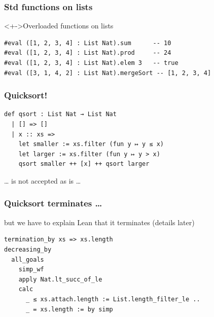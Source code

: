 \documentclass{beamer}
\begin{document}
\begin{frame}[fragile]
  \frametitle{Std functions on lists}
  \begin{block}<+->{Overloaded functions on lists}
\begin{lstlisting}
#eval ([1, 2, 3, 4] : List Nat).sum      -- 10
#eval ([1, 2, 3, 4] : List Nat).prod     -- 24
#eval ([1, 2, 3, 4] : List Nat).elem 3   -- true
#eval ([3, 1, 4, 2] : List Nat).mergeSort -- [1, 2, 3, 4]
\end{lstlisting}
  \end{block}
  
\end{frame}
\begin{frame}[fragile]
  \frametitle{Quicksort!}
\begin{lstlisting}
def qsort : List Nat → List Nat
  | [] => []
  | x :: xs =>
    let smaller := xs.filter (fun y ↦ y ≤ x)
    let larger := xs.filter (fun y ↦ y > x)
    qsort smaller ++ [x] ++ qsort larger
\end{lstlisting}
  \dots{} is not accepted as is \dots
\end{frame}
\begin{frame}[fragile]
  \frametitle{Quicksort terminates \dots}
  but we have to explain Lean that it terminates (details later)
\begin{lstlisting}
termination_by xs => xs.length
decreasing_by
  all_goals
    simp_wf
    apply Nat.lt_succ_of_le
    calc
      _ ≤ xs.attach.length := List.length_filter_le ..
      _ = xs.length := by simp
\end{lstlisting}
\end{frame}
\end{document}
